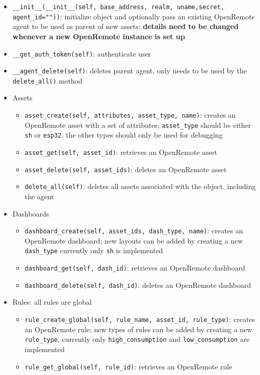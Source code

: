 \begin{appendices}
\begin{itemize}
\item \lstinline{__init__(__init__(self, base_address, realm, uname,secret, agent_id=""))}: initialize object and optionally pass an existing OpenRemote agent to be used as parent of new assets; \textbf{details need to be changed whenever a new OpenRemote instance is set up}
\item \lstinline{__get_auth_token(self)}: authenticate user
\item \lstinline{__agent_delete(self)}: deletes parent agent, only needs to be used by the \lstinline{delete_all()} method
\item Assets
    \begin{itemize}
    \item \lstinline{asset_create(self, attributes, asset_type, name)}: creates an OpenRemote asset with a set of attributes; \lstinline{asset_type} should be either \lstinline{sh} or \lstinline{esp32}, the other types should only be used for debugging
    \item \lstinline{asset_get(self, asset_id)}: retrieves an OpenRemote asset
    \item \lstinline{asset_delete(self, asset_ids)}: deletes an OpenRemote asset 
    \item \lstinline{delete_all(self)}: deletes all assets associated with the object, including the agent
    \end{itemize}
\item Dashboards
    \begin{itemize}
    \item \lstinline{dashboard_create(self, asset_ids, dash_type, name)}: creates an OpenRemote dashboard; new layouts can be added by creating a new \lstinline{dash_type} currently only \lstinline{sh} is implemented
    \item \lstinline{dashboard_get(self, dash_id)}: retrieves an OpenRemote dashboard
    \item \lstinline{dashboard_delete(self, dash_id)}: deletes an OpenRemote dashboard
    \end{itemize}
\item Rules: all rules are global
    \begin{itemize}
    \item \lstinline{rule_create_global(self, rule_name, asset_id, rule_type)}: creates an OpenRemote rule; new types of rules can be added by creating a new \lstinline{rule_type}, currently only \lstinline{high_consumption} and \lstinline{low_consumption} are implemented
    \item \lstinline{rule_get_global(self, rule_id)}: retrieves an OpenRemote rule

\end{itemize}
\end{itemize}
\end{appendices}
